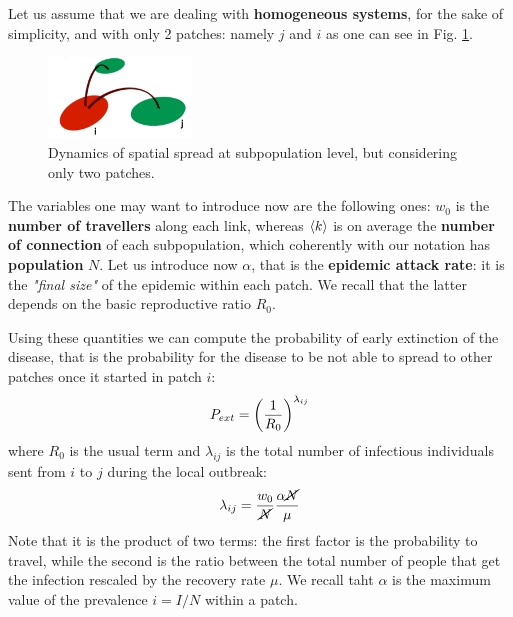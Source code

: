 \documentclass[../main/main.tex]{subfiles}
\begin{document}
Let us assume that we are dealing with \textbf{homogeneous systems}, for the sake of simplicity, and with only 2 patches: namely $j$ and $i$ as one can see in Fig. \ref{fig:16_03}.

\begin{figure}[h!]
\centering
\includegraphics[width=0.34\textwidth]{../lessons/image/16/image03.png}
\caption{\label{fig:16_03} Dynamics of spatial spread at subpopulation level, but considering only two patches.}
\end{figure}

The variables one may want to introduce now are the following ones: $w_0$ is the \textbf{number of travellers} along each link, whereas $\expval{k}$ is on average the \textbf{number of connection} of each subpopulation, which coherently with our notation has \textbf{population} $N$. Let us introduce now $\alpha$, that is the \textbf{epidemic attack rate}: it is the \textit{"final size"} of the epidemic within each patch. We recall that the latter depends on the basic reproductive ratio $R_0$.

Using these quantities we can compute the probability of early extinction of the disease, that is the probability for the disease to be not able to spread to other patches once it started in patch $i$:
\begin{equation}
    P_{ext} = \qty( \frac{1}{R_0} )^{\lambda_{ij}}
\end{equation}
where $R_0$ is the usual term and $\lambda_{ij}$ is the total number of infectious individuals sent from $i$ to $j$ during the local outbreak:
\begin{equation}
    \lambda_{ij} = \frac{w_0}{\cancel{N}} \frac{\alpha \cancel{N}}{\mu}
\end{equation}
Note that it is the product of two terms: the first factor is the probability to travel, while the second is the ratio between the total number of people that get the infection rescaled by the recovery rate $\mu$. We recall taht $\alpha$ is the maximum value of the prevalence $i = I/N$ within a patch.
\end{document}
